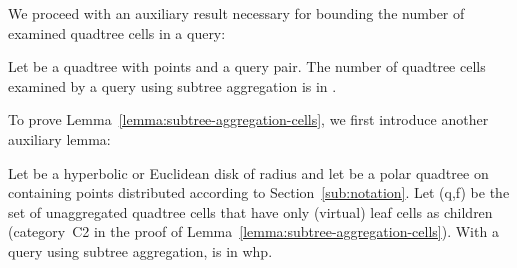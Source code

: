 \documentclass{llncs}
\begin{document}
We proceed with an auxiliary result necessary for bounding the number of examined quadtree cells in a query:


\begin{lemma}
Let  be a quadtree with  points and  a query pair.
The number of quadtree cells examined by a query using subtree aggregation is in .
\label{lemma:subtree-aggregation-cells}
\end{lemma}

To prove Lemma~\ref{lemma:subtree-aggregation-cells}, we first introduce another auxiliary lemma:
\begin{lemma}
Let  be a hyperbolic or Euclidean disk of radius  and let  be a polar quadtree on  
containing  points distributed according to Section~\ref{sub:notation}.
Let \uaqcset(q,f) be the set of unaggregated quadtree cells that have only (virtual) leaf cells as children (category~C2 in the proof of Lemma~\ref{lemma:subtree-aggregation-cells}).
 With a query using subtree aggregation,  is in  whp.
 \label{lemma:bound-unaggregated-quadtree-cells-with-leaf-children}
\end{lemma}
\end{document}
